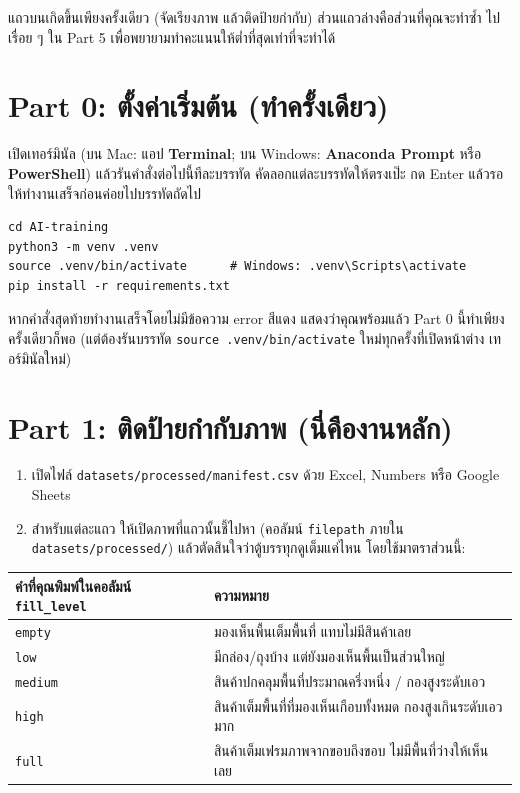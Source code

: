 \documentclass[11pt]{article}
\begin{document}
แถวบนเกิดขึ้นเพียงครั้งเดียว (จัดเรียงภาพ แล้วติดป้ายกำกับ) ส่วนแถวล่างคือส่วนที่คุณจะทำซ้ำ
ไปเรื่อย ๆ ใน Part 5 เพื่อพยายามทำคะแนนให้ต่ำที่สุดเท่าที่จะทำได้

\section*{Part 0: ตั้งค่าเริ่มต้น (ทำครั้งเดียว)}
เปิดเทอร์มินัล (บน Mac: แอป \textbf{Terminal}; บน Windows: \textbf{Anaconda Prompt} หรือ
\textbf{PowerShell}) แล้วรันคำสั่งต่อไปนี้ทีละบรรทัด คัดลอกแต่ละบรรทัดให้ตรงเป๊ะ กด Enter
แล้วรอให้ทำงานเสร็จก่อนค่อยไปบรรทัดถัดไป

\begin{lstlisting}
cd AI-training
python3 -m venv .venv
source .venv/bin/activate      # Windows: .venv\Scripts\activate
pip install -r requirements.txt
\end{lstlisting}

หากคำสั่งสุดท้ายทำงานเสร็จโดยไม่มีข้อความ error สีแดง แสดงว่าคุณพร้อมแล้ว Part 0 นี้ทำเพียง
ครั้งเดียวก็พอ (แต่ต้องรันบรรทัด \texttt{source .venv/bin/activate} ใหม่ทุกครั้งที่เปิดหน้าต่าง
เทอร์มินัลใหม่)

\section*{Part 1: ติดป้ายกำกับภาพ (นี่คืองานหลัก)}
\begin{enumerate}
  \item เปิดไฟล์ \texttt{datasets/processed/manifest.csv} ด้วย Excel, Numbers หรือ Google Sheets
  \item สำหรับแต่ละแถว ให้เปิดภาพที่แถวนั้นชี้ไปหา (คอลัมน์ \texttt{filepath} ภายใน \texttt{datasets/processed/}) แล้วตัดสินใจว่าตู้บรรทุกดูเต็มแค่ไหน โดยใช้มาตราส่วนนี้:
\end{enumerate}

\begin{center}
\begin{tabular}{@{}ll@{}}
\toprule
\textbf{คำที่คุณพิมพ์ในคอลัมน์ \texttt{fill\_level}} & \textbf{ความหมาย} \\
\midrule
\texttt{empty}  & มองเห็นพื้นเต็มพื้นที่ แทบไม่มีสินค้าเลย \\
\texttt{low}    & มีกล่อง/ถุงบ้าง แต่ยังมองเห็นพื้นเป็นส่วนใหญ่ \\
\texttt{medium} & สินค้าปกคลุมพื้นที่ประมาณครึ่งหนึ่ง / กองสูงระดับเอว \\
\texttt{high}   & สินค้าเต็มพื้นที่ที่มองเห็นเกือบทั้งหมด กองสูงเกินระดับเอวมาก \\
\texttt{full}   & สินค้าเต็มเฟรมภาพจากขอบถึงขอบ ไม่มีพื้นที่ว่างให้เห็นเลย \\
\bottomrule
\end{tabular}
\end{center}
\end{document}
